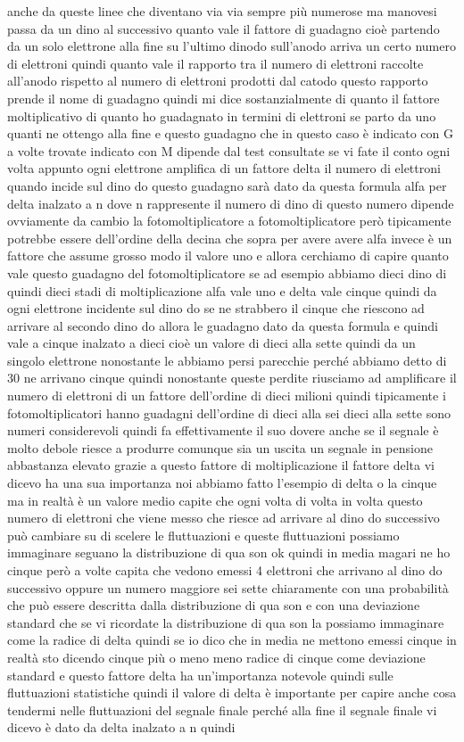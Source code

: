{anche da queste linee che diventano via via sempre più numerose ma manovesi passa da un dino al successivo quanto vale il fattore di guadagno cioè partendo da un solo elettrone alla fine su l'ultimo dinodo sull'anodo arriva un certo numero di elettroni quindi quanto vale il rapporto tra il numero di elettroni raccolte all'anodo rispetto al numero di elettroni prodotti dal catodo questo rapporto prende il nome di guadagno quindi mi dice sostanzialmente di quanto il fattore moltiplicativo di quanto ho guadagnato in termini di elettroni se parto da uno quanti ne ottengo alla fine e questo guadagno che in questo caso è indicato con G a volte trovate indicato con M dipende dal test consultate se vi fate il conto ogni volta appunto ogni elettrone amplifica di un fattore delta il numero di elettroni quando incide sul dino do questo guadagno sarà dato da questa formula alfa per delta inalzato a n dove n rappresente il numero di dino di questo numero dipende ovviamente da cambio la fotomoltiplicatore a fotomoltiplicatore però tipicamente potrebbe essere dell'ordine della decina che sopra per avere avere alfa invece è un fattore che assume grosso modo il valore uno e allora cerchiamo di capire quanto vale questo guadagno del fotomoltiplicatore se ad esempio abbiamo dieci dino di quindi dieci stadi di moltiplicazione alfa vale uno e delta vale cinque quindi da ogni elettrone incidente sul dino do se ne strabbero il cinque che riescono ad arrivare al secondo dino do allora le guadagno dato da questa formula e quindi vale a cinque inalzato a dieci cioè un valore di dieci alla sette quindi da un singolo elettrone nonostante le abbiamo persi parecchie perché abbiamo detto di 30 ne arrivano cinque quindi nonostante queste perdite riusciamo ad amplificare il numero di elettroni di un fattore dell'ordine di dieci milioni quindi tipicamente i fotomoltiplicatori hanno guadagni dell'ordine di dieci alla sei dieci alla sette sono numeri considerevoli quindi fa effettivamente il suo dovere anche se il segnale è molto debole riesce a produrre comunque sia un uscita un segnale in pensione abbastanza elevato grazie a questo fattore di moltiplicazione il fattore delta vi dicevo ha una sua importanza noi abbiamo fatto l'esempio di delta o la cinque ma in realtà è un valore medio capite che ogni volta di volta in volta questo numero di elettroni che viene messo che riesce ad arrivare al dino do successivo può cambiare su di scelere le fluttuazioni e queste fluttuazioni possiamo immaginare seguano la distribuzione di qua son ok quindi in media magari ne ho cinque però a volte capita che vedono emessi 4 elettroni che arrivano al dino do successivo oppure un numero maggiore sei sette chiaramente con una probabilità che può essere descritta dalla distribuzione di qua son e con una deviazione standard che se vi ricordate la distribuzione di qua son la possiamo immaginare come la radice di delta quindi se io dico che in media ne mettono emessi cinque in realtà sto dicendo cinque più o meno meno radice di cinque come deviazione standard e questo fattore delta ha un'importanza notevole quindi sulle fluttuazioni statistiche quindi il valore di delta è importante per capire anche cosa tendermi nelle fluttuazioni del segnale finale perché alla fine il segnale finale vi dicevo è dato da delta inalzato a n quindi }
